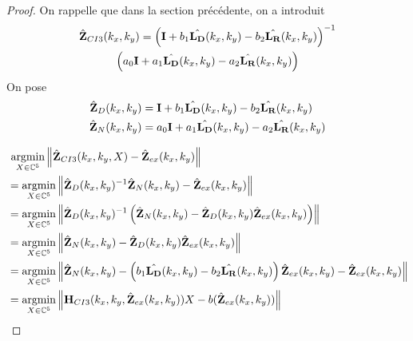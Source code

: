     \begin{proof}
      On rappelle que dans la section précédente, on a introduit
      \begin{multline*}
        \hat{\mathbf{Z}}_{CI3}(k_x,k_y) = \left(\mathbf{I} + b_1 \hat{\mathbf{L_D}}(k_x,k_y) - b_2 \hat{\mathbf{L_R}}(k_x,k_y) \right)^{-1}\\\left(a_0 \mathbf{I} + a_1 {\hat{\mathbf{L_D}}(k_x,k_y)} - a_2 {\hat{\mathbf{L_R}}(k_x,k_y)}\right)
      \end{multline*}
      On pose
      \begin{align*}
        \hat{\mathbf{Z}}_D(k_x,k_y) &= \mathbf{I} + b_1 \hat{\mathbf{L_D}}(k_x,k_y) - b_2 \hat{\mathbf{L_R}}(k_x,k_y)
        \\
        \hat{\mathbf{Z}}_N(k_x,k_y) &= a_0 \mathbf{I} + a_1 {\hat{\mathbf{L_D}}(k_x,k_y)} - a_2 {\hat{\mathbf{L_R}}(k_x,k_y)}
      \end{align*}

      \begin{align*}
      &{}~ {\underset{X\in\mathbb C^5}{\operatorname{argmin}}} \left\lVert\hat{\mathbf{Z}}_{CI3}(k_x,k_y,X) - \hat{\mathbf{Z}}_{ex}(k_x,k_y)\right\rVert
      \\
      & = {\underset{X\in\mathbb C^5}{\operatorname{argmin}}} \left\lVert\hat{\mathbf{Z}}_D(k_x,k_y)^{-1}\hat{\mathbf{Z}}_N(k_x,k_y) - \hat{\mathbf{Z}}_{ex}(k_x,k_y) \right\rVert
      \\
      &= {\underset{X\in\mathbb C^5}{\operatorname{argmin}}} \left\lVert\hat{\mathbf{Z}}_D(k_x,k_y)^{-1}\left(\hat{\mathbf{Z}}_N(k_x,k_y) - \hat{\mathbf{Z}}_D(k_x,k_y)\hat{\mathbf{Z}}_{ex}(k_x,k_y)\right) \right\rVert
      \\
      &= {\underset{X\in\mathbb C^5}{\operatorname{argmin}}} \left\lVert\hat{\mathbf{Z}}_N(k_x,k_y) - \hat{\mathbf{Z}}_D(k_x,k_y)\hat{\mathbf{Z}}_{ex}(k_x,k_y)\right\rVert
      \\
      &= {\underset{X\in\mathbb C^5}{\operatorname{argmin}}} \left\lVert\hat{\mathbf{Z}}_N(k_x,k_y) - \left(b_1 \hat{\mathbf{L_D}}(k_x,k_y) - b_2 \hat{\mathbf{L_R}}(k_x,k_y)\right)\hat{\mathbf{Z}}_{ex}(k_x,k_y) - \hat{\mathbf{Z}}_{ex}(k_x,k_y) \right\rVert
      \\
      &= {\underset{X\in\mathbb C^5}{\operatorname{argmin}}} \left\lVert\mathbf{H}_{CI3}(k_x,k_y,\hat{\mathbf{Z}}_{ex}(k_x,k_y))X - b(\hat{\mathbf{Z}}_{ex}(k_x,k_y))\right\rVert
      \end{align*}
    \end{proof}

